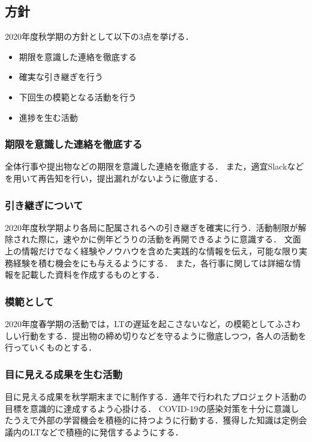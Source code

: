 \subsection*{\secondGrade{}方針}


2020年度秋学期の\secondGrade{}方針として以下の3点を挙げる．

\begin{itemize}
    \item 期限を意識した連絡を徹底する
    \item 確実な引き継ぎを行う
    \item 下回生の模範となる活動を行う
    \item 進捗を生む活動
\end{itemize}

\subsubsection*{期限を意識した連絡を徹底する}
全体行事や提出物などの期限を意識した連絡を徹底する．
また，適宜Slackなどを用いて再告知を行い，提出漏れがないように徹底する．

\subsubsection*{引き継ぎについて}
2020年度秋学期より各局に配属される\firstGrade{}への引き継ぎを確実に行う．活動制限が解除された際に，速やかに例年どうりの活動を再開できるように意識する．
文面上の情報だけでなく経験やノウハウを含めた実践的な情報を伝え，可能な限り実務経験を積む機会を\firstGrade{}にも与えるようにする．
また，各行事に関しては詳細な情報を記載した資料を作成するものとする．

\subsubsection*{模範として}
2020年度春学期の活動では，LTの遅延を起こさないなど，\firstGrade{}の模範としてふさわしい行動をする．提出物の締め切りなどを守るように徹底しつつ，各人の活動を行っていくものとする．

\subsubsection*{目に見える成果を生む活動}
目に見える成果を秋学期末までに制作する．通年で行われたプロジェクト活動の目標を意識的に達成するよう心掛ける．
COVID-19の感染対策を十分に意識したうえで外部の学習機会を積極的に持つように行動する．獲得した知識は定例会議内のLTなどで積極的に発信するようにする．

